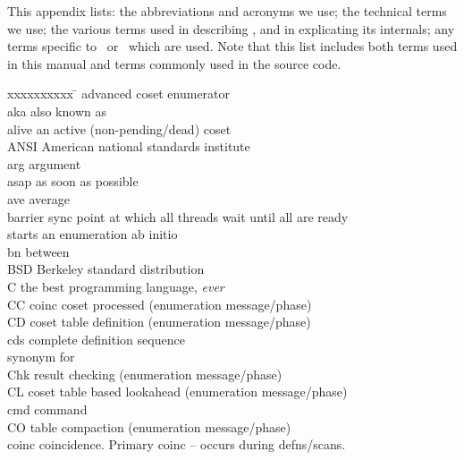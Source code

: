 
%
%

This appendix lists:
  the abbreviations and acronyms we use;
  the technical terms we use;
  the various terms used in describing \ace, and in explicating
    its internals;
  any terms specific to \pace\ or \peace\ which are used.
Note that this list includes both terms used in this manual and terms 
  commonly used in the source code.

\begin{tabbing}
xxxxxxxxxx 	\= \kill
\ace       	\> advanced coset enumerator \\ 
aka        	\> also known as \\
alive      	\> an active (non-pending/dead) coset \\
ANSI       	\> American national standards institute \\
arg        	\> argument \\
asap       	\> as soon as possible \\
ave	   	\> average \\
barrier	   	\> sync point at which all threads wait until all are ready \\
 	\> starts an enumeration ab initio \\
bn	   	\> between \\
BSD        	\> Berkeley standard distribution \\
C	   	\> the best programming language, \emph{ever} \\
CC         	\> coinc coset processed (enumeration message/phase) \\
CD         	\> coset table definition (enumeration message/phase) \\
cds	   	\> complete definition sequence \\
	\> synonym for  \\
Chk        	\> result checking (enumeration message/phase) \\
CL         	\> coset table based lookahead (enumeration message/phase) \\
cmd        	\> command \\
CO         	\> table compaction (enumeration message/phase) \\
coinc      	\> coincidence.  Primary coinc -- occurs during defns/scans. \\

\end{tabbing}
